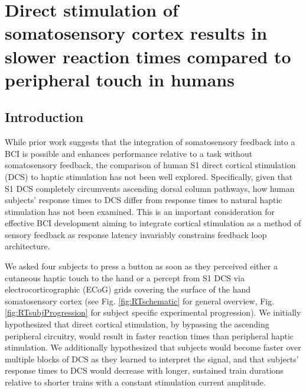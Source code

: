 
 
 
\chapter {Direct stimulation of somatosensory cortex results in slower reaction times compared to peripheral touch in humans}
\label{chap:responseTiming}

\section{Introduction}

While prior work suggests that the integration of somatosensory feedback into a BCI is possible and enhances performance relative to a task without somatosensory feedback, the comparison of human S1 direct cortical stimulation (DCS) to haptic stimulation has not been well explored. Specifically, given that S1 DCS completely circumvents ascending dorsal column pathways, how human subjects’ response times to DCS differ from response times to natural haptic stimulation has not been examined. This is an important consideration for effective BCI development aiming to integrate cortical stimulation as a method of sensory feedback as response latency invariably constrains feedback loop architecture.

We asked four subjects to press a button as soon as they perceived either a cutaneous haptic touch to the hand or a percept from S1 DCS via electrocorticographic (ECoG) grids covering the surface of the hand somatosensory cortex (see Fig. \ref{fig:RTschematic} for general overview, Fig. \ref{fig:RTsubjProgression} for subject specific experimental progression). We initially hypothesized that direct cortical stimulation, by bypassing the ascending peripheral circuitry, would result in faster reaction times than peripheral haptic stimulation. We additionally hypothesized that subjects would become faster over multiple blocks of DCS as they learned to interpret the signal, and that subjects’ response times to DCS would decrease with longer, sustained train durations relative to shorter trains with a constant stimulation current amplitude. 

